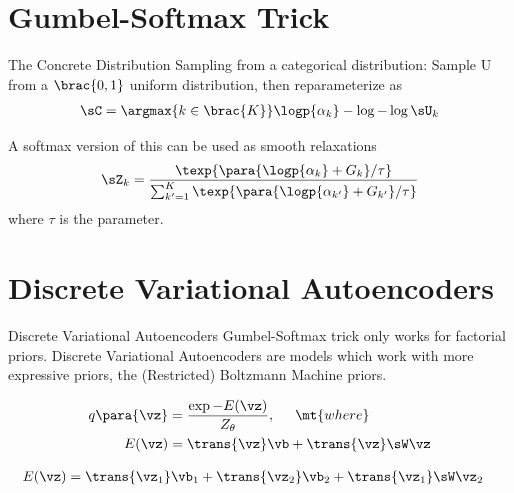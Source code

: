 \documentclass[9pt]{beamer}
\newcommand{\qp}{q\para}
\begin{document}
\section{Gumbel-Softmax Trick}
\begin{frame}{The Concrete Distribution}
	Sampling from a categorical distribution: Sample U from a $\brac{0, 1}$ uniform distribution, then reparameterize as
	\begin{align*}
		\sC = \argmax{k \in \brac{K}} \logp{\alpha_k} - \log{-\log{\sU_k}}
	\end{align*}

	A softmax version of this can be used as smooth relaxations
	\begin{align*}
		\sZ_k = \frac{\texp{\para{\logp{\alpha_k} + G_k} / \tau}}{\sum_{k' = 1}^K \texp{\para{\logp{\alpha_{k'}} + G_{k'}} / \tau}}
	\end{align*}
	where $\tau$ is the  parameter.
\end{frame}

\section{Discrete Variational Autoencoders}
\begin{frame}{Discrete Variational Autoencoders}
	Gumbel-Softmax trick only works for factorial priors. Discrete Variational Autoencoders are models which work with more expressive priors, the (Restricted) Boltzmann Machine priors.

	\begin{align*}
		\qp{\vz} &= \frac{\exp{-E(\vz)}}{Z_\theta}, \hspace{0.5cm} \mt{where}\\
		E(\vz) &= \trans{\vz} \vb + \trans{\vz} \sW \vz
	\end{align*}

	\begin{align*}
		E(\vz) &= \trans{\vz_1} \vb_1 + \trans{\vz_2} \vb_2 + \trans{\vz_1} \sW \vz_2
	\end{align*}
\end{frame}
\end{document}
